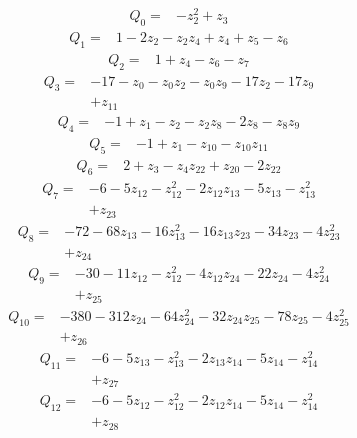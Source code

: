 \begingroup\small
\allowdisplaybreaks
\[\begin{aligned}Q_{0}={}&-z_{2}^{2}+z_{3}
\end{aligned}\]
\[\begin{aligned}Q_{1}={}&1-2z_{2}-z_{2}z_{4}+z_{4}+z_{5}-z_{6}
\end{aligned}\]
\[\begin{aligned}Q_{2}={}&1+z_{4}-z_{6}-z_{7}
\end{aligned}\]
\[\begin{aligned}Q_{3}={}&-17-z_{0}-z_{0}z_{2}-z_{0}z_{9}-17z_{2}-17z_{9}
\\&+z_{11}
\end{aligned}\]
\[\begin{aligned}Q_{4}={}&-1+z_{1}-z_{2}-z_{2}z_{8}-2z_{8}-z_{8}z_{9}
\end{aligned}\]
\[\begin{aligned}Q_{5}={}&-1+z_{1}-z_{10}-z_{10}z_{11}
\end{aligned}\]
\[\begin{aligned}Q_{6}={}&2+z_{3}-z_{4}z_{22}+z_{20}-2z_{22}
\end{aligned}\]
\[\begin{aligned}Q_{7}={}&-6-5z_{12}-z_{12}^{2}-2z_{12}z_{13}-5z_{13}-z_{13}^{2}
\\&+z_{23}
\end{aligned}\]
\[\begin{aligned}Q_{8}={}&-72-68z_{13}-16z_{13}^{2}-16z_{13}z_{23}-34z_{23}-4z_{23}^{2}
\\&+z_{24}
\end{aligned}\]
\[\begin{aligned}Q_{9}={}&-30-11z_{12}-z_{12}^{2}-4z_{12}z_{24}-22z_{24}-4z_{24}^{2}
\\&+z_{25}
\end{aligned}\]
\[\begin{aligned}Q_{10}={}&-380-312z_{24}-64z_{24}^{2}-32z_{24}z_{25}-78z_{25}-4z_{25}^{2}
\\&+z_{26}
\end{aligned}\]
\[\begin{aligned}Q_{11}={}&-6-5z_{13}-z_{13}^{2}-2z_{13}z_{14}-5z_{14}-z_{14}^{2}
\\&+z_{27}
\end{aligned}\]
\[\begin{aligned}Q_{12}={}&-6-5z_{12}-z_{12}^{2}-2z_{12}z_{14}-5z_{14}-z_{14}^{2}
\\&+z_{28}
\end{aligned}\]
